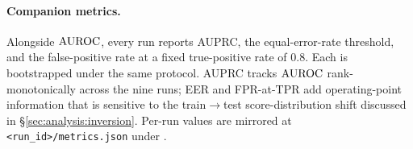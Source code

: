 \paragraph{Companion metrics.} Alongside $\mathrm{AUROC}$, every run reports
AUPRC, the equal-error-rate threshold, and the false-positive rate at a
fixed true-positive rate of $0.8$. Each is bootstrapped under the same
protocol. AUPRC tracks $\mathrm{AUROC}$ rank-monotonically across the nine runs;
EER and FPR-at-TPR add operating-point information that is sensitive to
the train$\to$test score-distribution shift discussed in
\S\ref{sec:analysis:inversion}. Per-run values are mirrored at
\texttt{<run\_id>/metrics.json} under \runarchive.
